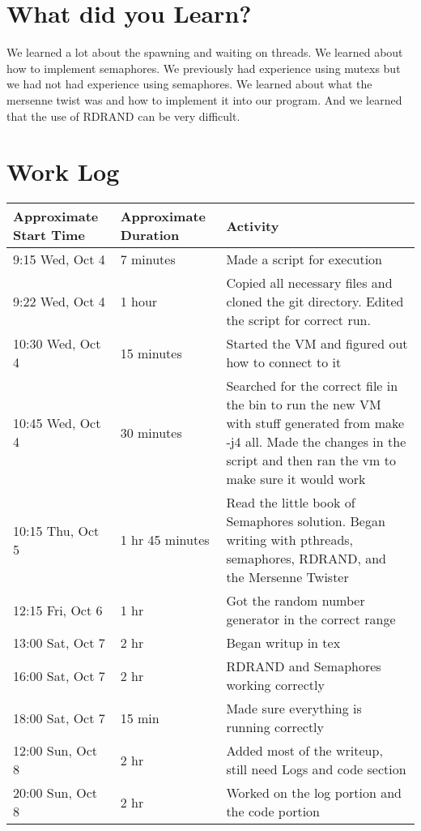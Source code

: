 \documentclass[10pt,onecolumn]{article}
\begin{document}
\section{What did you Learn?}
We learned a lot about the spawning and waiting on threads. We learned about how to implement semaphores. We previously had experience using mutexs but we had not had experience using semaphores. We learned about what the mersenne twist was and how to implement it into our program. And we learned that the use of RDRAND can be very difficult.

\section{Work Log}
\begin{tabular}{|p{5cm}|p{5cm}|p{5cm}}
\textbf{Approximate Start Time} & \textbf{Approximate Duration} & \textbf{Activity} \\
\hline
9:15 Wed, Oct 4 & 7 minutes & Made a script for execution \\\hline
9:22 Wed, Oct 4 & 1 hour & Copied all necessary files and cloned the git directory. Edited the script for correct run. \\\hline
10:30 Wed, Oct 4 & 15 minutes & Started the VM and figured out how to connect to it \\\hline
10:45 Wed, Oct 4 & 30 minutes & Searched for the correct file in the bin to run the new VM with stuff generated from make -j4 all. Made the changes in the script and then ran the vm to make sure it would work \\
10:15 Thu, Oct 5 & 1 hr 45 minutes & Read the little book of Semaphores solution. Began writing with pthreads, semaphores, RDRAND, and the Mersenne Twister \\\hline
12:15 Fri, Oct 6 & 1 hr & Got the random number generator in the correct range \\\hline
13:00 Sat, Oct 7 & 2 hr & Began writup in tex \\\hline
16:00 Sat, Oct 7 & 2 hr & RDRAND and Semaphores working correctly \\\hline
18:00 Sat, Oct 7 & 15 min & Made sure everything is running correctly \\\hline
12:00 Sun, Oct 8 & 2 hr & Added most of the writeup, still need Logs and code section \\\hline
20:00 Sun, Oct 8 & 2 hr & Worked on the log portion and the code portion \\\hline
\end{tabular}
\end{document}
